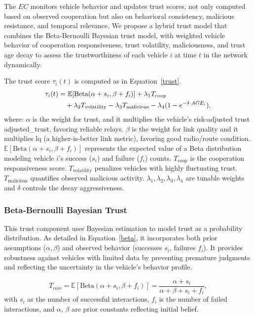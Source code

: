 \cite{cho2010survey}\documentclass[journal,comsoc,twoside]{IEEEtran}
\begin{document}
The $EC$ monitors vehicle behavior and updates trust scores, not only computed based on observed cooperation but also on behavioral consistency, malicious resistance, and temporal relevance. We propose a hybrid trust model that combines the Beta‑Bernoulli Bayesian trust model, with weighted vehicle behavior of cooperation responsiveness, trust volatility, maliciousness, and trust age decay to assess the trustworthiness  of each vehicle $i$ at time $t$ in the network dynamically.

The trust score $\tau_i(t)$ is computed as in Equation~\ref{trust}.
\begin{align}
\label{trust}
\tau_i(t) &= \mathbb{E}[\text{Beta}(\alpha + s_i, \beta + f_i)] + \lambda_1 T_{\text{coop}} \notag \\
         &\quad + \lambda_2 T_{\text{volatility}} - \lambda_3 T_{\text{malicious}} - \lambda_4 (1 - e^{-\delta \cdot AGE_i}),
\end{align}
where: $\alpha$ is the weight for trust, and it multiplies the vehicle’s risk‑adjusted trust adjusted\_trust, favoring reliable relays.
$\beta$ is the weight for link quality and it multiplies lq (a higher‑is‑better link metric), favoring good radio/route condition. $\mathbb{E}[\text{Beta}(\alpha + s_i, \beta + f_i)]$ represents the expected value of a Beta distribution modeling vehicle $i$'s success ($s_i$) and failure ($f_i$) counts. $T_{\text{coop}}$ is the cooperation responsiveness score. $T_{\text{volatility}}$ penalizes vehicles with highly fluctuating trust. $T_{\text{malicious}}$ quantifies observed malicious activity. $\lambda_1, \lambda_2, \lambda_3, \lambda_4$ are tunable weights and $\delta$ controls the decay aggressiveness.

\subsubsection{Beta‑Bernoulli Bayesian Trust}
This trust component uses Bayesian estimation to model trust as a probability distribution. As detailed in Equation~\ref{beta}, it incorporates both prior assumptions (\(\alpha, \beta\)) and observed behavior (successes \(s_i\), failures \(f_i\)). It provides robustness against vehicles with limited data by preventing premature judgments and reflecting the uncertainty in the vehicle's behavior profile.

\begin{equation}
\label{beta}
T_{\text{core}} = \mathbb{E}[\text{Beta}(\alpha + s_i, \beta + f_i)] = \frac{\alpha + s_i}{\alpha + \beta + s_i + f_i},
\end{equation}
with $s_i$ as the number of successful interactions, $f_i$ is the number of failed interactions, and $\alpha$, $\beta$ are prior constants reflecting initial belief.
\end{document}
